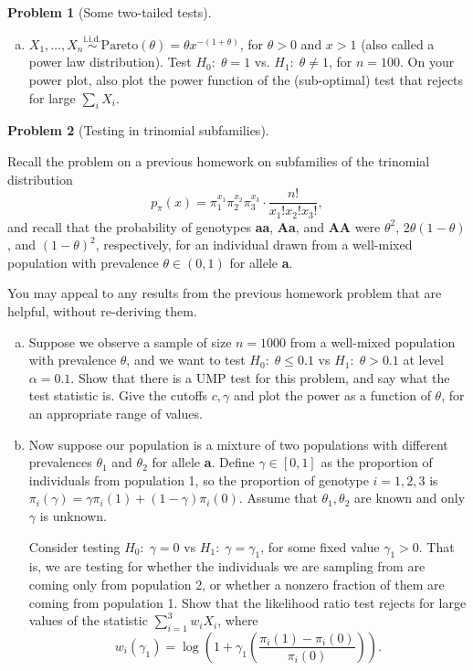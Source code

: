 \documentclass{article}
\newcommand{\simiid}{\overset{\text{i.i.d.}}{\sim}}
\theoremstyle{definition}
\newtheorem{problem}{Problem}
\begin{document}
\begin{problem}[Some two-tailed tests]
\begin{enumerate}[(a)]
\item $X_1,\ldots, X_n \simiid \text{Pareto}(\theta) = \theta x^{-(1+\theta)}$, for $\theta > 0$ and $x > 1$ (also called a power law distribution). Test $H_0:\; \theta = 1$ vs. $H_1:\; \theta \neq 1$, for $n = 100$. On your power plot, also plot the power function of the (sub-optimal) test that rejects for large $\sum_i X_i$.


\end{enumerate}

\end{problem}



\begin{problem}[Testing in trinomial subfamilies]
  \label{prob:trinomial-testing}

  Recall the problem on a previous homework on subfamilies of the trinomial distribution
  \[
  p_\pi(x) = \pi_1^{x_1}\pi_2^{x_2}\pi_3^{x_3} \cdot \frac{n!}{x_1! x_2! x_3!},
  \]
  and recall that the probability of genotypes {\bf aa}, {\bf Aa}, and {\bf AA} were $\theta^2$, $2\theta(1-\theta)$, and $(1-\theta)^2$, respectively, for an individual drawn from a well-mixed population with prevalence $\theta\in (0,1)$ for allele {\bf a}. 

  You may appeal to any results from the previous homework problem that are helpful, without re-deriving them.

 \begin{enumerate}[(a)]
      
  \item Suppose we observe a sample of size $n = 1000$ from a well-mixed population with prevalence $\theta$, and we want to test $H_0:\;\theta \leq 0.1$ vs $H_1:\; \theta > 0.1$ at level $\alpha = 0.1$. Show that there is a UMP test for this problem, and say what the test statistic is. Give the cutoffs $c,\gamma$ and plot the power as a function of $\theta$, for an appropriate range of values.

    


  \item Now suppose our population is a mixture of two populations with different prevalences $\theta_1$ and $\theta_2$ for allele {\bf a}. Define $\gamma \in [0,1]$ as the proportion of individuals from population 1, so the proportion of genotype $i=1,2,3$ is $\pi_i(\gamma) = \gamma \pi_i(1) + (1-\gamma)\pi_i(0)$. Assume that $\theta_1,\theta_2$ are known and only $\gamma$ is unknown.

    Consider testing  $H_0:\;\gamma = 0$ vs $H_1:\;\gamma = \gamma_1$, for some fixed value $\gamma_1 > 0$. That is, we are testing for whether the individuals we are sampling from are coming only from population 2, or whether a nonzero fraction of them are coming from population 1. Show that the likelihood ratio test rejects for large values of the statistic  $\sum_{i=1}^3 w_iX_i$, where
    \[
    w_i(\gamma_1) = \log\left(1 + \gamma_1\left(\frac{\pi_i(1)-\pi_i(0)}{\pi_i(0)}\right)\right).
    \]
    

\end{enumerate}
\end{problem}
\end{document}
